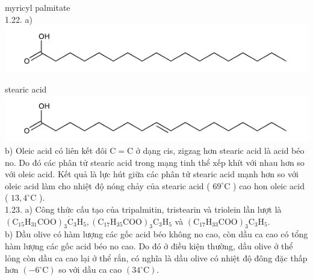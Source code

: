 \documentclass[10pt]{article}
\begin{document}
myricyl palmitate\\
1.22. a)\\
\includegraphics{smile-fcada1d664f81e415c0b420d6c448a01c45a27dc}

stearic acid\\
\includegraphics{smile-f855672583878fcd318c0e47e4f9100d28a50c2b}\\
b) Oleic acid có liên kết đôi $\mathrm{C}=\mathrm{C}$ ở dạng cis, zigzag hơn stearic acid là acid béo no. Do đó các phân tử stearic acid trong mạng tinh thể xếp khít với nhau hơn so với oleic acid. Kết quả là lực hút giữa các phân tử stearic acid mạnh hơn so với oleic acid làm cho nhiệt độ nóng chảy của stearic acid ( $69^{\circ} \mathrm{C}$ ) cao hon oleic acid ( $13,4^{\circ} \mathrm{C}$ ).\\
1.23. a) Công thức cấu tạo của tripalmitin, tristearin và triolein lần lượt là $\left(\mathrm{C}_{15} \mathrm{H}_{31} \mathrm{COO}\right)_{3} \dot{\mathrm{C}}_{3} \mathrm{H}_{5},\left(\mathrm{C}_{17} \mathrm{H}_{35} \mathrm{COO}\right)_{3} \mathrm{C}_{3} \mathrm{H}_{5}$ và $\left(\mathrm{C}_{17} \mathrm{H}_{33} \mathrm{COO}\right)_{3} \mathrm{C}_{3} \mathrm{H}_{5}$.\\
b) Dầu olive có hàm lượng các gốc acid béo không no cao, còn dầu ca cao có tổng hàm lượng các gốc acid béo no cao. Do đó ở điều kiện thường, dầu olive ở thể lỏng còn dầu ca cao lại ở thể rắn, có nghĩa là dầu olive có nhiệt độ đông đặc thấp hơn $\left(-6^{\circ} \mathrm{C}\right)$ so với dầu ca cao $\left(34^{\circ} \mathrm{C}\right)$.\\
\end{document}
